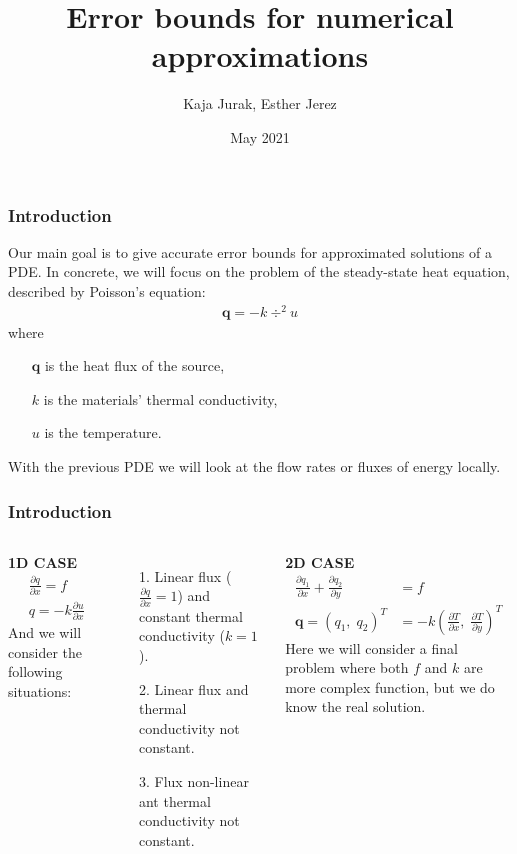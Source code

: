 \documentclass[t]{beamer}
\title{Error bounds for numerical approximations}
\author[MAT264] 
{Kaja Jurak, Esther Jerez}
\institute[UIB]
{
	Faculty of Mathematics\\
	University of Bergen
	
}
\date[2021]
{May 2021}
\begin{document}
	\frame{\titlepage}
	\begin{frame}
	\frametitle{Introduction}
	Our main goal is to give accurate error bounds for approximated solutions of a PDE. In concrete, we will focus on the problem of the steady-state heat equation, described by  \alert{Poisson's equation}:
	\begin{align*}
	\bm{q} = -k \div ^2 u
	\end{align*}
	where 
	\begin{enumerate}
		\item[] $\bm{q}$ is the heat flux of the source,
		\item[] $k$ is the materials' thermal conductivity,
		\item[] $u$ is the temperature.
	\end{enumerate}
	With the previous PDE we will look at the flow rates or fluxes of energy locally. \\
	
	
\end{frame}

\begin{frame}
\frametitle{Introduction}
\begin{columns}[t]
	\textbf{1D CASE}
	\begin{align*}
	&\frac{\partial q}{\partial x} = f \\
	&q = -k \frac{\partial u}{\partial x} 
	\end{align*}
	And we will consider the following situations:
	\begin{itemize}
		\item[1.] Linear flux ($\frac{\partial q}{\partial x} = 1$) and constant thermal conductivity ($k=1$).
		\item[2.] Linear flux and thermal conductivity not constant.
		\item[3.] Flux non-linear ant thermal conductivity not constant.
	\end{itemize}
	
	\textbf{2D CASE} \\
	\begin{align*}
	\frac{\partial q_1}{\partial x} + \frac{\partial q_2}{\partial y}  &= f \\
	\bm{q} = (q_1,\; q_2)^T  &= -k \left( \frac{\partial T}{\partial x} ,\; \frac{\partial T}{\partial y}\right)^T
	\end{align*}
	Here we will consider a final problem where both $f$ and $k$ are more complex function, but we do know the real solution.
\end{columns}        
\end{frame}
\end{document}
